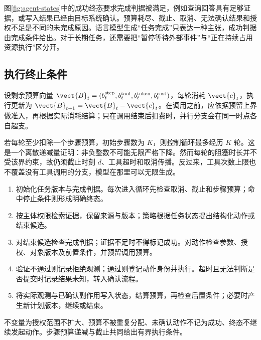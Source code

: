 \documentclass[../textbook.tex]{subfiles}
\begin{document}
图\ref{fig:agent-states}中的成功终态要求完成判据被满足，例如查询回答具有足够证据，或写入结果已经由目标系统确认。预算耗尽、截止、取消、无法确认结果和授权不足是不同的未完成原因。语言模型生成“任务完成”只表达一种主张，成功判据由完成条件给出。对于长期任务，还需要把“暂停等待外部事件”与“正在持续占用资源执行”区分开。

\subsection{执行终止条件}
设剩余预算向量 $\vect{B}_t=(b_t^{\mathrm{step}},b_t^{\mathrm{tool}},b_t^{\mathrm{token}},b_t^{\mathrm{cost}})$，每轮消耗 $\vect{c}_t$，执行更新为 $\vect{B}_{t+1}=\vect{B}_t-\vect{c}_t$。在调用之前，应依据预留上界做准入，再根据实际消耗结算；只在调用结束后扣费时，并行分支会在同一时点各自超支。

若每轮至少扣除一个步骤预算，初始步骤数为 $K$，则控制循环最多经历 $K$ 轮。这是一个离散递减量证明：非负整数不可能无限严格下降。然而每轮的阻塞时长并不受该界约束，故仍须截止时刻 $d$、工具超时和取消传播。反过来，工具次数上限也不覆盖没有工具调用的分支，模型在那里可以无限生成。

\begin{algorithm}[受限闭环控制]
\begin{enumerate}
\item 初始化任务版本与完成判据。每次进入循环先检查取消、截止和步骤预算；命中停止条件则形成明确终态。
\item 按主体权限检索证据，保留来源与版本；策略根据任务状态提出结构化动作或结束候选。
\item 对结束候选检查完成判据；证据不足时不得标记成功。对动作检查参数、授权、对象版本及前置条件，并预留调用预算。
\item 验证不通过则记录拒绝观测；通过则登记动作身份并执行。超时且无法判断是否提交时记录结果未知，转入确认流程。
\item 将实际观测与已确认副作用写入状态，结算预算，再检查后置条件；必要时产生新计划版本，继续或结束。
\end{enumerate}
不变量为授权范围不扩大、预算不被重复分配、未确认动作不记为成功、终态不继续发起动作。步骤预算递减与截止共同给出有界执行条件。
\end{algorithm}
\end{document}
